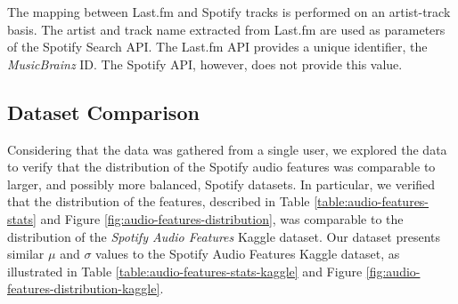 \documentclass[sn-mathphys]{sn-jnl}%
\theoremstyle{thmstyleone}%
\theoremstyle{thmstyletwo}%
\theoremstyle{thmstylethree}%
\begin{document}
The mapping between Last.fm and Spotify tracks is performed on an artist-track basis.
The artist and track name extracted from Last.fm are used as parameters of the Spotify Search API.
The Last.fm API provides a unique identifier, the \emph{MusicBrainz} ID.
The Spotify API, however, does not provide this value.

\subsection{Dataset Comparison}

Considering that the data was gathered from a single user,
we explored the data to verify that the distribution of the Spotify audio features
was comparable to larger, and possibly more balanced, Spotify datasets.
In particular, we verified that the distribution of the features,
described in Table \ref{table:audio-features-stats} and Figure \ref{fig:audio-features-distribution},
was comparable to the distribution of the \emph{Spotify Audio Features} Kaggle dataset.
Our dataset presents similar $\mu$ and $\sigma$ values to the Spotify Audio Features Kaggle dataset,
as illustrated in Table \ref{table:audio-features-stats-kaggle}
and Figure \ref{fig:audio-features-distribution-kaggle}.

\end{document}
